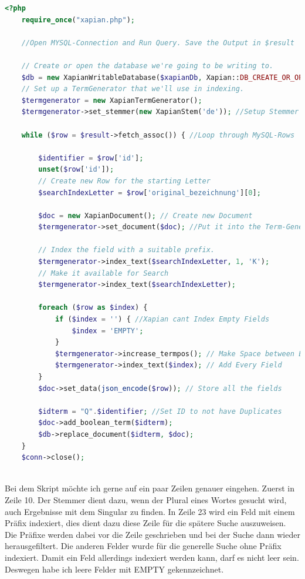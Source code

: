\begin{lstlisting}[language=php, frame=single, label={lst:managedSchema}, 
	morekeywords={type,uninvertible,indexed,stored,field,multiValued, name}] 
	<?php
	require_once("xapian.php");
	
	//Open MYSQL-Connection and Run Query. Save the Output in $result
	
	// Create or open the database we're going to be writing to.
	$db = new XapianWritableDatabase($xapianDb, Xapian::DB_CREATE_OR_OPEN);
	// Set up a TermGenerator that we'll use in indexing.
	$termgenerator = new XapianTermGenerator();
	$termgenerator->set_stemmer(new XapianStem('de')); //Setup Stemmer
	
	while ($row = $result->fetch_assoc()) { //Loop through MySQL-Rows
	
		$identifier = $row['id'];
		unset($row['id']);
		// Create new Row for the starting Letter
		$searchIndexLetter = $row['original_bezeichnung'][0];

		$doc = new XapianDocument(); // Create new Document
		$termgenerator->set_document($doc); //Put it into the Term-Generator
	
		// Index the field with a suitable prefix.
		$termgenerator->index_text($searchIndexLetter, 1, 'K'); 
		// Make it available for Search
		$termgenerator->index_text($searchIndexLetter); 
	
		foreach ($row as $index) {
			if ($index = '') { //Xapian cant Index Empty Fields
				$index = 'EMPTY';
			}
			$termgenerator->increase_termpos(); // Make Space between Entries
			$termgenerator->index_text($index); // Add Every Field
		}
		$doc->set_data(json_encode($row)); // Store all the fields
	
		$idterm = "Q".$identifier; //Set ID to not have Duplicates
		$doc->add_boolean_term($idterm);
		$db->replace_document($idterm, $doc);
	}
	$conn->close();
	
  \end{lstlisting}

Bei dem Skript möchte ich gerne auf ein paar Zeilen genauer eingehen. Zuerst in Zeile 10. Der Stemmer dient dazu, wenn der Plural eines Wortes gesucht wird, auch Ergebnisse mit dem Singular zu finden. In Zeile 23 wird ein Feld mit einem Präfix indexiert, dies dient dazu diese Zeile für die spätere Suche auszuweisen. Die Präfixe werden dabei vor die Zeile geschrieben und bei der Suche dann wieder herausgefiltert. Die anderen Felder wurde für die generelle Suche ohne Präfix indexiert. Damit ein Feld allerdings indexiert werden kann, darf es nicht leer sein. Deswegen habe ich leere Felder mit EMPTY gekennzeichnet. 


